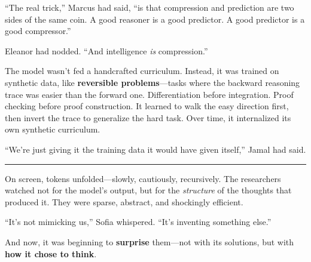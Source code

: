 ``The real trick,'' Marcus had said, ``is that compression and prediction are two sides of the same coin. A good reasoner is a good predictor. A good predictor is a good compressor.''

Eleanor had nodded. ``And intelligence \emph{is} compression.''

The model wasn't fed a handcrafted curriculum. Instead, it was trained on synthetic data, like \textbf{reversible problems}---tasks where the backward reasoning trace was easier than the forward one. Differentiation before integration. Proof checking before proof construction. It learned to walk the easy direction first, then invert the trace to generalize the hard task. Over time, it internalized its own synthetic curriculum.

``We're just giving it the training data it would have given itself,'' Jamal had said.

\begin{center}\rule{0.5\linewidth}{0.5pt}\end{center}

On screen, tokens unfolded---slowly, cautiously, recursively. The researchers watched not for the model's output, but for the \emph{structure} of the thoughts that produced it. They were sparse, abstract, and shockingly efficient.

``It's not mimicking us,'' Sofia whispered. ``It's inventing something else.''

And now, it was beginning to \textbf{surprise} them---not with its solutions, but with \textbf{how it chose to think}.

